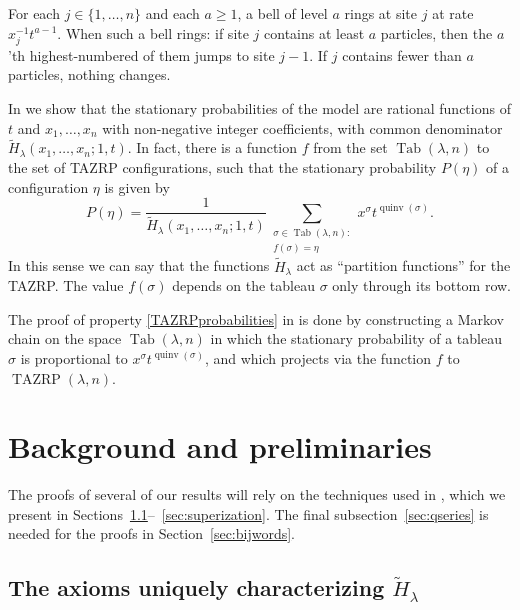 \documentclass[11pt]{article}
\theoremstyle{definition}
\numberwithin{equation}{section}
\DeclareMathOperator{\PQT}{Tab}
\DeclareMathOperator{\quinv}{quinv}
\DeclareMathOperator{\TAZRP}{TAZRP}
\begin{document}
For each $j\in\{1,\dots,n\}$ and each $a\geq 1$, a bell of level $a$ rings at site $j$ at rate
$x_j^{-1} t^{a-1}$. 
When such a bell rings: if site $j$ contains at least $a$ particles, 
then the $a$'th highest-numbered of them jumps to site $j-1$. If $j$ contains fewer
than $a$ particles, nothing changes. 


In \cite{AMM22} we show that 
the stationary probabilities of the model are rational functions of 
$t$ and $x_1, \dots, x_n$ with non-negative integer coefficients, with 
common denominator
$\widetilde{H}_{\lambda}(x_1,\ldots,x_n;1,t)$. 
In fact, there is a function $f$ from the set $\PQT(\lambda, n)$
to the set of TAZRP configurations, 
such that the stationary probability $P(\eta)$ of a configuration $\eta$ is given 
by
\begin{equation}\label{TAZRPprobabilities}
P(\eta)=
\frac{1}{
\widetilde{H}_{\lambda}(x_1,\ldots,x_n;1,t)
}
{
\sum_{
\substack{
\sigma\in\PQT(\lambda,n): 
\\
f(\sigma)=\eta
}
}
x^\sigma t^{\quinv(\sigma)}
}.
\end{equation}
In this sense we can say that the functions $\widetilde{H}_{\lambda}$ 
act as  ``partition functions'' for the TAZRP.
The value $f(\sigma)$ depends on the tableau $\sigma$ only through its bottom row. 

The proof of property \eqref{TAZRPprobabilities} in \cite{AMM22} is done by constructing a Markov chain on the space $\PQT(\lambda, n)$ in which the stationary probability of a tableau $\sigma$ is proportional to $x^\sigma t^{\quinv(\sigma)}$, and which projects via the function $f$ to $\TAZRP(\lambda,n)$. 


\section{Background and preliminaries}
\label{sec:background}

The proofs of several of our results will rely on the techniques used in \cite{HHL05}, which we present in Sections~\ref{sec:axioms}--~\ref{sec:superization}. The final subsection~\ref{sec:qseries} is needed for the proofs in Section~\ref{sec:bijwords}.

\subsection{The axioms uniquely characterizing $\widetilde{H}_{\lambda}$}\label{sec:axioms}
\end{document}
